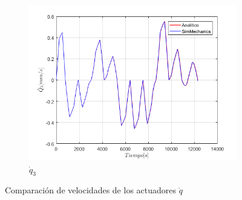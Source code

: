 \begin{figure}
\begin{subfigure}{0.45\textwidth}
        \includegraphics[width=\linewidth]{Cap4_DisenoBasico/Figura/ComparativoSimMechanics/Qpunto3.png}
        \caption{$\dot{q}_3$}
    \end{subfigure}
    \caption{Comparación de velocidades de los actuadores $\dot{q}$}
\end{figure}

